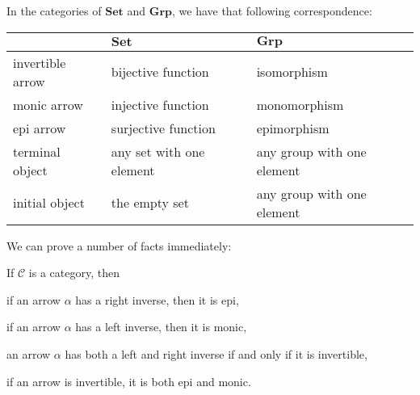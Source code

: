\begin{example}
  In the categories of $\mathbf{Set}$ and $\mathbf{Grp}$, we have 
  that following correspondence:
  
  \begin{tabular}{l|ll}
     & $\mathbf{Set}$ & $\mathbf{Grp}$ \\
     \hline
     invertible arrow & bijective function & isomorphism \\
     monic arrow & injective function & monomorphism \\
     epi arrow & surjective function & epimorphism \\
     terminal object & any set with one element & any group with one 
     element \\
     initial object & the empty set & any group with one element
  \end{tabular}
  
\end{example}

We can prove a number of facts immediately:

\begin{proposition}
  If $\mathcal{C}$ is a category, then
  \begin{theoremenum}
    \item if an arrow $\alpha$ has a right inverse, then it is epi, 

    \item if an arrow $\alpha$ has a left inverse, then it is monic,
    
    \item an arrow $\alpha$ has both a left and right inverse if and
    only if it is invertible,
    
    \item if an arrow is invertible, it is both epi and monic.

  \end{theoremenum}
\end{proposition}

